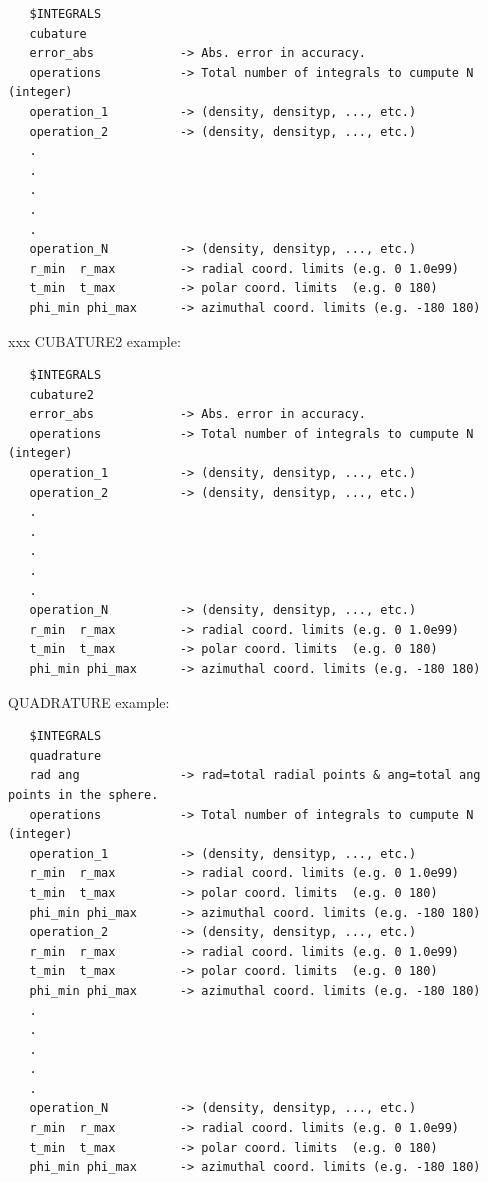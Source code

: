 \documentclass[10pt,a4paper]{article}
\begin{document}
\begin{verbatim}
   $INTEGRALS
   cubature
   error_abs            -> Abs. error in accuracy.     
   operations           -> Total number of integrals to cumpute N (integer)
   operation_1          -> (density, densityp, ..., etc.) 
   operation_2          -> (density, densityp, ..., etc.) 
   .
   .
   .
   .
   .
   operation_N          -> (density, densityp, ..., etc.) 
   r_min  r_max         -> radial coord. limits (e.g. 0 1.0e99)
   t_min  t_max         -> polar coord. limits  (e.g. 0 180)
   phi_min phi_max      -> azimuthal coord. limits (e.g. -180 180)
\end{verbatim}
{\color{white} xxx \newline}
\noindent CUBATURE2 example:\newline

\begin{verbatim}
   $INTEGRALS
   cubature2
   error_abs            -> Abs. error in accuracy.     
   operations           -> Total number of integrals to cumpute N (integer)
   operation_1          -> (density, densityp, ..., etc.) 
   operation_2          -> (density, densityp, ..., etc.) 
   .
   .
   .
   .
   .
   operation_N          -> (density, densityp, ..., etc.) 
   r_min  r_max         -> radial coord. limits (e.g. 0 1.0e99)
   t_min  t_max         -> polar coord. limits  (e.g. 0 180)
   phi_min phi_max      -> azimuthal coord. limits (e.g. -180 180)
\end{verbatim}
\noindent QUADRATURE example:\newline
\begin{verbatim}
   $INTEGRALS
   quadrature
   rad ang              -> rad=total radial points & ang=total ang points in the sphere.     
   operations           -> Total number of integrals to cumpute N (integer)
   operation_1          -> (density, densityp, ..., etc.) 
   r_min  r_max         -> radial coord. limits (e.g. 0 1.0e99)
   t_min  t_max         -> polar coord. limits  (e.g. 0 180)
   phi_min phi_max      -> azimuthal coord. limits (e.g. -180 180)
   operation_2          -> (density, densityp, ..., etc.) 
   r_min  r_max         -> radial coord. limits (e.g. 0 1.0e99)
   t_min  t_max         -> polar coord. limits  (e.g. 0 180)
   phi_min phi_max      -> azimuthal coord. limits (e.g. -180 180)
   .
   .
   .
   .
   .
   operation_N          -> (density, densityp, ..., etc.) 
   r_min  r_max         -> radial coord. limits (e.g. 0 1.0e99)
   t_min  t_max         -> polar coord. limits  (e.g. 0 180)
   phi_min phi_max      -> azimuthal coord. limits (e.g. -180 180)
\end{verbatim}
\end{document}

